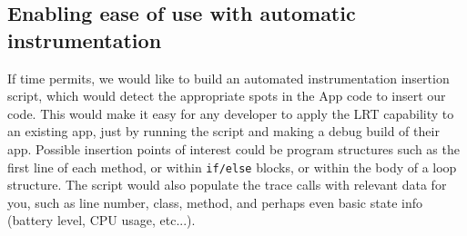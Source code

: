 \documentclass{acm_proc_article-sp}
\begin{document}
\subsection{Enabling ease of use with automatic instrumentation}
If time permits, we would like to build an automated instrumentation insertion 
script, which would detect the appropriate spots in the App code to insert our 
code. This would make it easy for any developer to apply the LRT capability to
an existing app, just by running the script and making a debug build of their 
app. Possible insertion points of interest could be program structures such as the first
line of each method, or within \texttt{if/else} blocks, or within the body of
a loop structure. The script would also populate the trace calls with relevant data
for you, such as line number, class, method, and perhaps even basic state info (battery
level, CPU usage, etc...).




{}

\end{document}
